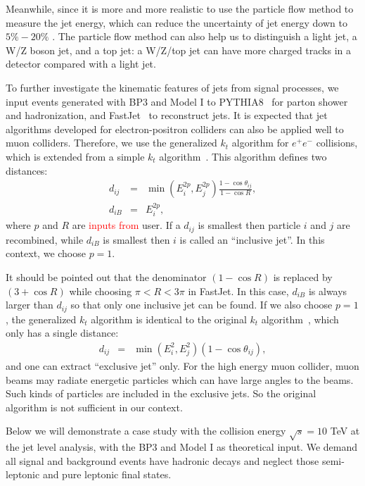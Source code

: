 \documentclass[a4paper,11pt]{article}
\begin{document}
Meanwhile, since it is more and more realistic to use the particle flow method to measure the jet energy, 
which can reduce the uncertainty of jet energy down to $5\%-20\%$ \cite{Nachman:2022emq}. 
 The particle flow method can also help us to distinguish a light jet, 
a W/Z boson jet, and a top jet: a W/Z/top jet can have more charged tracks in a detector compared with a light jet.

To further investigate the kinematic features of jets from signal processes, 
we input events generated with BP3 and Model I to PYTHIA8~\cite{Bierlich:2022pfr} for parton shower and hadronization, 
and FastJet~\cite{Cacciari:2011ma} to reconstruct jets.  
It is expected that jet algorithms developed for electron-positron colliders can also be applied well to muon colliders. 
Therefore, we use the generalized $k_t$ algorithm for $e^+e^-$ collisions,
which is extended from a simple $k_t$ algorithm~\cite{Catani:1991hj}.
This algorithm defines two distances:
\begin{eqnarray}
  d_{ij} &=& \min(E^{2p}_i,E^{2p}_j)\frac{1-\cos\theta_{ij}}{1-\cos{R}}, \label{eq:genkt1}\\
  d_{iB} &=& E^{2p}_i, \label{eq:genkt2}
\end{eqnarray}
where $p$ and $R$ are \textcolor{red}{inputs from} user. 
If a $d_{ij}$ is smallest then particle $i$ and $j$ are recombined, 
while $d_{iB}$ is smallest then $i$ is called an ``inclusive jet''.
In this context, we choose $p=1$.

It should be pointed out that the denominator $(1-\cos{R})$ is replaced by $(3+\cos{R})$ while choosing $\pi<R<3\pi$ in FastJet.
In this case, $d_{iB}$ is always larger than $d_{ij}$ so that only one inclusive jet can be found.  
If we also choose $p=1$, the generalized $k_t$ algorithm is identical to the original $k_t$ algorithm~\cite{Catani:1991hj}, 
which only has a single distance:
\begin{eqnarray}
  d_{ij} &=& \min(E^{2}_i,E^{2}_j)\left(1-\cos\theta_{ij}\right), \label{eq:eekt}
\end{eqnarray}
and one can extract ``exclusive jet'' only. 
For the high energy muon collider, muon beams may radiate energetic particles which can have large angles to the beams. 
Such kinds of particles are included in the exclusive jets. 
So the original algorithm is not sufficient in our context.

Below we will demonstrate a case study with the collision energy $\sqrt{s}=10$ TeV at the jet level analysis, 
with the BP3 and Model I as theoretical input. 
We demand all signal and background events have hadronic decays and neglect those semi-leptonic and pure leptonic final states. 
\end{document}
